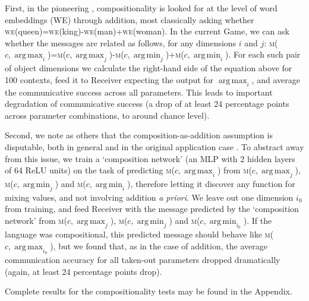 \documentclass[11pt,a4paper]{article}
\DeclareMathOperator*{\argmax}{arg\,max}
\DeclareMathOperator*{\argmin}{arg\,min}
\newcommand{\nbEC}[1]{{\leavevmode\color{blue}{\scriptsize#1}}}
\newcommand{\nbSST}[1]{{\leavevmode\color{violet}{\scriptsize#1}}}
\begin{document}
\newcommand{\WE}[1]{\textsc{we}(#1)}
\newcommand{\MESS}[1]{\textsc{m}(#1)}

First, in the pioneering \citealp{mikolov_efficient_2013}, compositionality is looked for at the level of word embeddings (WE) through addition, most classically asking whether  
\WE{queen}=\WE{king}-\WE{man}+\WE{woman}. In the current Game, we can ask whether the messages are related as follows, for any dimensions $i$ and $j$:
\MESS{$c, \argmax_i$}=\MESS{$c, \argmax_j$}-\MESS{$c, \argmin_j$}+\MESS{$c, \argmin_i$}.
For each such pair of object dimensions we calculate the right-hand side of the equation above for 100 contexts, feed it to Receiver expecting the output for $\argmax_i$, and average the communicative success across all parameters. This leads to important degradation of communicative success (a drop of at least 24 percentage points across parameter combinations, to around chance level). 


Second, we note as others that the composition-as-addition assumption is disputable, both in general and in the original application case \citep{linzen-2016-issues, Chen2017}. To abstract away from this issue, we train a `composition network' (an MLP with 2 hidden layers of 64 ReLU units) on the task of predicting 
\MESS{$c, \argmax_i$} from \MESS{$c, \argmax_j$}, \MESS{$c, \argmin_j$} and \MESS{$c, \argmin_i$}, therefore letting it discover any function for mixing values, and not involving addition \emph{a priori}. We leave out one dimension $i_0$ from training, and feed Receiver with the message predicted by the `composition network' from \MESS{$c, \argmax_j$}, \MESS{$c, \argmin_j$} and \MESS{$c, \argmin_{i_0}$}. If the language was compositional, this predicted message should behave like \MESS{$c, \argmax_{i_0}$}, but we found that, as in the case of addition, the average communication accuracy for all taken-out parameters dropped dramatically (again, at least 24 percentage points drop).

Complete results for the compositionality tests may be found in the Appendix.

\end{document}

